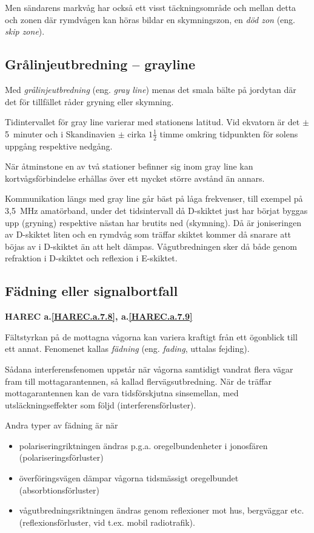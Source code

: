 Men sändarens markvåg har också ett visst täckningsområde och mellan
detta och zonen där rymdvågen kan höras bildar en skymningszon, en
\emph{död zon} (eng. \emph{skip zone}).

\subsection{Grålinjeutbredning -- grayline}

Med \emph{grålinjeutbredning} (eng. \emph{gray line}) menas det smala bälte på
jordytan där det för tillfället råder gryning eller skymning.

Tidintervallet för gray line varierar med stationens latitud.
Vid ekvatorn är det \(\pm\) 5~minuter och i Skandinavien \(\pm\) cirka
\(1\frac{1}{2}\) timme omkring tidpunkten för solens uppgång
respektive nedgång.

När åtminstone en av två stationer befinner sig inom gray line kan
kortvågsförbindelse erhållas över ett mycket större avstånd än annars.

Kommunikation längs med gray line går bäst på låga frekvenser,
till exempel på 3,5~MHz amatörband, under det tidsintervall då D-skiktet just
har börjat byggas upp (gryning) respektive nästan har brutits ned (skymning).
Då är joniseringen av D-skiktet liten och en rymdvåg som
träffar skiktet kommer då snarare att böjas av i D-skiktet än att helt dämpas.
Vågutbredningen sker då både genom refraktion i D-skiktet och reflexion i
E-skiktet.

\subsection{Fädning eller signalbortfall}
\textbf{
HAREC a.\ref{HAREC.a.7.8}\label{myHAREC.a.7.8},
 a.\ref{HAREC.a.7.9}\label{myHAREC.a.7.9}
}

Fältstyrkan på de mottagna vågorna kan variera kraftigt från ett ögonblick till
ett annat.
Fenomenet kallas \emph{fädning} (eng. \emph{fading}, uttalas fejding).

Sådana interferensfenomen uppstår när vågorna samtidigt vandrat flera
vägar fram till mottagarantennen, så kallad flervägsutbredning.
När de träffar mottagarantennen kan de vara tidsförskjutna sinsemellan, med
utsläckningseffekter som följd (interferensförluster).

Andra typer av fädning är när
\begin{itemize}
\item polariseringriktningen ändras p.g.a. oregelbundenheter i
  jonosfären (polariseringsförluster)
\item överföringsvägen dämpar vågorna tidsmässigt oregelbundet
  (absorbtionsförluster)
\item vågutbredningsriktningen ändras genom reflexioner mot hus,
  bergväggar etc. (reflexionsförluster, vid t.ex. mobil radiotrafik).
\end{itemize}

